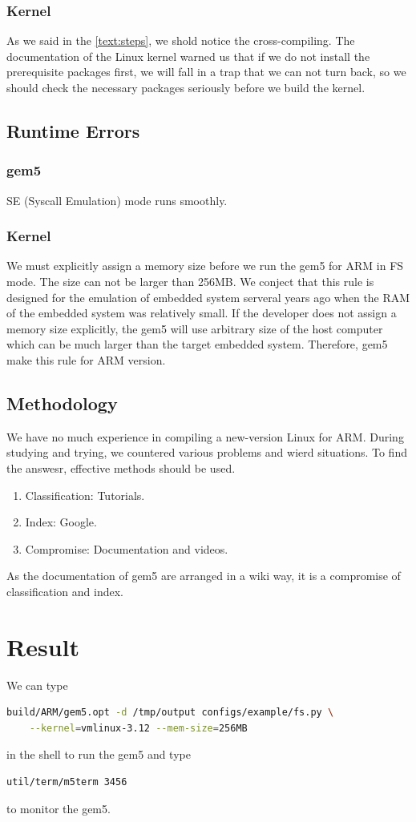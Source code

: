 \documentclass[utf8,a4paper]{article}
\begin{document}
		\subsubsection{Kernel}
			As we said in the \autoref{text:steps}, we shold notice the cross-compiling.  The documentation of the Linux kernel warned us that if we do not install the prerequisite packages first, we will fall in a trap that we can not turn back, so we should check the necessary packages seriously before we build the kernel.

	\subsection{Runtime Errors}
		\subsubsection{gem5}
				SE (Syscall Emulation) mode runs smoothly.
		\subsubsection{Kernel}
	We must explicitly assign a memory size before we run the gem5 for ARM in FS mode. The size can not be larger than 256MB. We conject that this rule is designed for the emulation of embedded system serveral years ago when the RAM of the embedded system was relatively small. If the developer does not assign a memory size explicitly, the gem5 will use arbitrary size of the host computer which can be much larger than the target embedded system. Therefore, gem5 make this rule for ARM version.

\subsection{Methodology}
We have no much experience in compiling a new-version Linux for ARM. During studying and trying, we countered various problems and wierd situations. To find the answesr, effective methods should be used.
	\begin{enumerate}
		\item
		Classification: Tutorials.
		\item
		Index: Google.
		\item
		Compromise: Documentation and videos.
	\end{enumerate}
As the documentation of gem5 are arranged in a wiki way, it is a compromise of classification and index.
\section{Result}
We can type
\begin{lstlisting}[language=bash, frame=shadowbox]
build/ARM/gem5.opt -d /tmp/output configs/example/fs.py \
	--kernel=vmlinux-3.12 --mem-size=256MB
\end{lstlisting}
in  the shell to run the gem5 and type
\begin{lstlisting}[language=bash, frame=shadowbox]
util/term/m5term 3456
\end{lstlisting}
to monitor the gem5.
\end{document}
